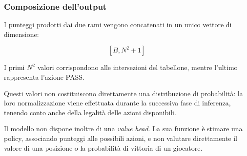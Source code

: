 \subsubsection{Composizione dell'output}

I punteggi prodotti dai due rami vengono concatenati in un unico vettore di dimensione:

\[
    [B, N^2 + 1]
\]

I primi $N^2$ valori corrispondono alle intersezioni del tabellone, mentre l'ultimo rappresenta l'azione PASS.

Questi valori non costituiscono direttamente una distribuzione di probabilità: la loro normalizzazione viene effettuata durante la successiva fase di inferenza, tenendo conto anche della legalità delle azioni disponibili.

Il modello non dispone inoltre di una \textit{value head}.
La sua funzione è stimare una policy, associando punteggi alle possibili azioni, e non valutare direttamente il valore di una posizione o la probabilità di vittoria di un giocatore.
